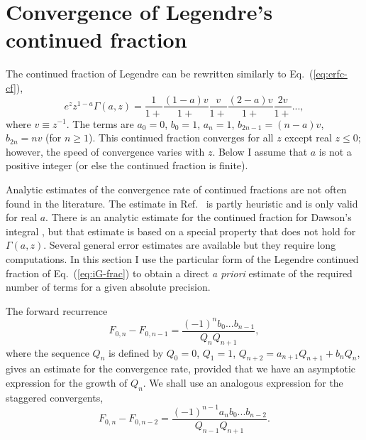 \documentclass{llncs}
\begin{document}
\section{Convergence of Legendre's continued fraction}

The continued fraction of Legendre can be rewritten similarly to Eq.~(\ref{eq:erfc-cf}),\begin{equation}
e^{z}z^{1-a}\Gamma \left(a,z\right)=\frac{1}{1+}\frac{\left(1-a\right)v}{1+}\frac{v}{1+}\frac{\left(2-a\right)v}{1+}\frac{2v}{1+}...,\label{eq:iG-frac}\end{equation}
where $v\equiv z^{-1}$. The terms are $a_{0}=0$, $b_{0}=1$, $a_{n}=1$,
$b_{2n-1}=\left(n-a\right)v$, $b_{2n}=nv$ (for $n\geq 1$). This
continued fraction converges for all $z$ except real $z\leq 0$;
however, the speed of convergence varies with $z$. Below I assume
that $a$ is not a positive integer (or else the continued fraction
is finite).

Analytic estimates of the convergence rate of continued fractions
are not often found in the literature. The estimate in Ref.~\cite{Gautschi79}
is partly heuristic and is only valid for real $a$. There is an analytic
estimate for the continued fraction for Dawson's integral \cite{McCabe74},
but that estimate is based on a special property that does not hold
for $\Gamma \left(a,z\right)$. Several general error estimates are
available \cite{Field77} but they require long computations. In this
section I use the particular form of the Legendre continued fraction
of Eq.~(\ref{eq:iG-frac}) to obtain a direct \emph{a priori} estimate
of the required number of terms for a given absolute precision.

The forward recurrence\begin{equation}
F_{0,n}-F_{0,n-1}=\frac{\left(-1\right)^{n}b_{0}...b_{n-1}}{Q_{n}Q_{n+1}},\end{equation}
where the sequence $Q_{n}$ is defined by $Q_{0}=0$, $Q_{1}=1$,
$Q_{n+2}=a_{n+1}Q_{n+1}+b_{n}Q_{n}$, gives an estimate for the convergence
rate, provided that we have an asymptotic expression for the growth
of $Q_{n}$. We shall use an analogous expression for the staggered
convergents,\begin{equation}
F_{0,n}-F_{0,n-2}=\frac{\left(-1\right)^{n-1}a_{n}b_{0}...b_{n-2}}{Q_{n-1}Q_{n+1}}.\label{eq:F2diff}\end{equation}
\end{document}
